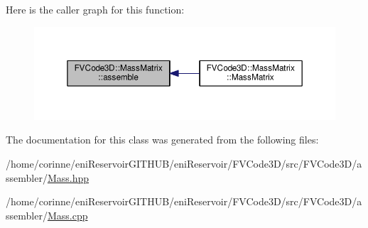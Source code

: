 Here is the caller graph for this function\+:
\nopagebreak
\begin{figure}[H]
\begin{center}
\leavevmode
\includegraphics[width=350pt]{classFVCode3D_1_1MassMatrix_ac5f8226ecd4e8d193bfe1bd87c0918e4_icgraph}
\end{center}
\end{figure}




The documentation for this class was generated from the following files\+:\begin{DoxyCompactItemize}
\item 
/home/corinne/eni\+Reservoir\+G\+I\+T\+H\+U\+B/eni\+Reservoir/\+F\+V\+Code3\+D/src/\+F\+V\+Code3\+D/assembler/\hyperlink{Mass_8hpp}{Mass.\+hpp}\item 
/home/corinne/eni\+Reservoir\+G\+I\+T\+H\+U\+B/eni\+Reservoir/\+F\+V\+Code3\+D/src/\+F\+V\+Code3\+D/assembler/\hyperlink{Mass_8cpp}{Mass.\+cpp}\end{DoxyCompactItemize}
